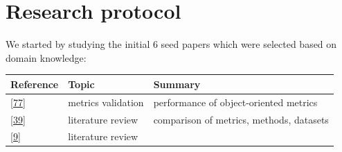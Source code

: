 \documentclass[]{book}
\begin{document}
\section{Research protocol}\label{research-protocol-1}

We started by studying the initial 6 seed papers which were selected
based on domain knowledge:

\begin{longtable}[]{@{}lll@{}}
\toprule
\begin{minipage}[b]{0.23\columnwidth}\raggedright\strut
Reference\strut
\end{minipage} & \begin{minipage}[b]{0.18\columnwidth}\raggedright\strut
Topic\strut
\end{minipage} & \begin{minipage}[b]{0.50\columnwidth}\raggedright\strut
Summary\strut
\end{minipage}\tabularnewline
\midrule
\endhead
\begin{minipage}[t]{0.23\columnwidth}\raggedright\strut
{[}\protect\hyperlink{ref-Gyimothy2005}{77}{]}\strut
\end{minipage} & \begin{minipage}[t]{0.18\columnwidth}\raggedright\strut
metrics validation\strut
\end{minipage} & \begin{minipage}[t]{0.50\columnwidth}\raggedright\strut
performance of object-oriented metrics\strut
\end{minipage}\tabularnewline
\begin{minipage}[t]{0.23\columnwidth}\raggedright\strut
{[}\protect\hyperlink{ref-Catal2009review}{39}{]}\strut
\end{minipage} & \begin{minipage}[t]{0.18\columnwidth}\raggedright\strut
literature review\strut
\end{minipage} & \begin{minipage}[t]{0.50\columnwidth}\raggedright\strut
comparison of metrics, methods, datasets\strut
\end{minipage}\tabularnewline
\begin{minipage}[t]{0.23\columnwidth}\raggedright\strut
{[}\protect\hyperlink{ref-Arisholm2010}{9}{]}\strut
\end{minipage} & \begin{minipage}[t]{0.18\columnwidth}\raggedright\strut
literature review\strut
\end{minipage} & \begin{minipage}[t]{0.50\columnwidth}\raggedright\strut

\end{minipage}
\end{longtable}
\end{document}
